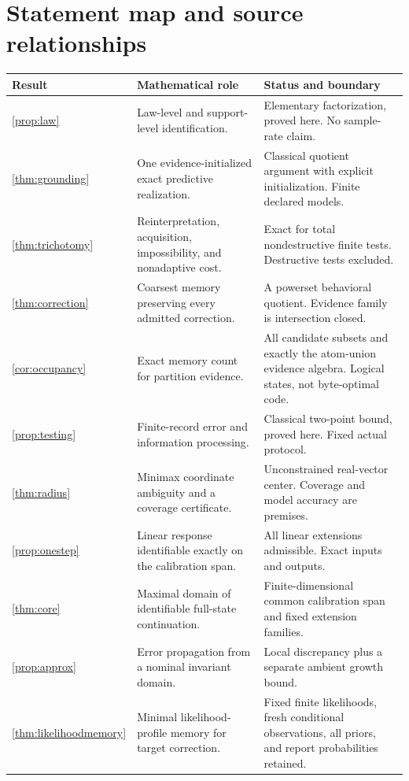 \documentclass[11pt,letterpaper]{article}
\theoremstyle{plain}
\theoremstyle{definition}
\begin{document}
\FloatBarrier\clearpage
\appendix
\section{Statement map and source relationships}\label{app:claims}
\begin{small}\begin{longtable}{@{}P{.13\linewidth}P{.44\linewidth}P{.35\linewidth}@{}}\toprule
Result & Mathematical role & Status and boundary\\\midrule\endhead
\ref{prop:law} & Law-level and support-level identification. & Elementary factorization, proved here. No sample-rate claim.\\
\ref{thm:grounding} & One evidence-initialized exact predictive realization. & Classical quotient argument with explicit initialization. Finite declared models.\\
\ref{thm:trichotomy} & Reinterpretation, acquisition, impossibility, and nonadaptive cost. & Exact for total nondestructive finite tests. Destructive tests excluded.\\
\ref{thm:correction} & Coarsest memory preserving every admitted correction. & A powerset behavioral quotient. Evidence family is intersection closed.\\
\ref{cor:occupancy} & Exact memory count for partition evidence. & All candidate subsets and exactly the atom-union evidence algebra. Logical states, not byte-optimal code.\\
\ref{prop:testing} & Finite-record error and information processing. & Classical two-point bound, proved here. Fixed actual protocol.\\
\ref{thm:radius} & Minimax coordinate ambiguity and a coverage certificate. & Unconstrained real-vector center. Coverage and model accuracy are premises.\\
\ref{prop:onestep} & Linear response identifiable exactly on the calibration span. & All linear extensions admissible. Exact inputs and outputs.\\
\ref{thm:core} & Maximal domain of identifiable full-state continuation. & Finite-dimensional common calibration span and fixed extension families.\\
\ref{prop:approx} & Error propagation from a nominal invariant domain. & Local discrepancy plus a separate ambient growth bound.\\
\ref{thm:likelihoodmemory} & Minimal likelihood-profile memory for target correction. & Fixed finite likelihoods, fresh conditional observations, all priors, and report probabilities retained.\\

\end{longtable}
\end{small}
\end{document}
